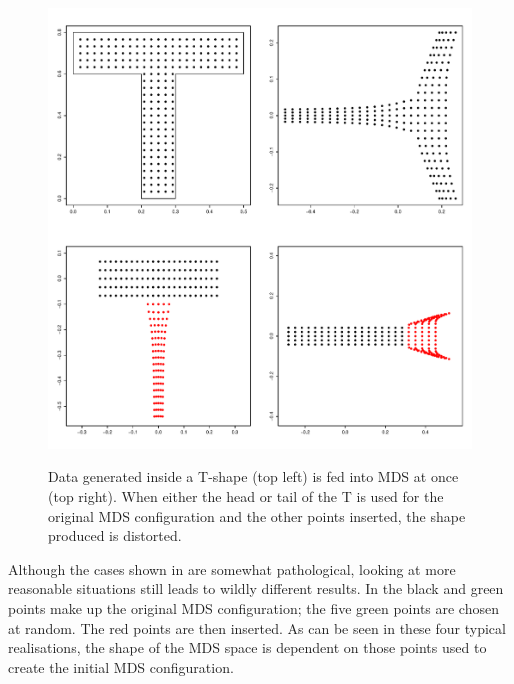 \begin{figure}
\centering
\includegraphics[width=6in]{mds/figs/tshape.pdf} \\
\caption{Data generated inside a T-shape (top left) is fed into MDS at once (top right). When either the head or tail of the T is used for the original MDS configuration and the other points inserted, the shape produced is distorted.}
\label{tshape}
\end{figure}

Although the cases shown in  are somewhat pathological, looking at more reasonable situations still leads to wildly different results. In  the black and green points make up the original MDS configuration; the five green points are chosen at random. The red points are then inserted. As can be seen in these four typical realisations, the shape of the MDS space is dependent on those points used to create the initial MDS configuration.

